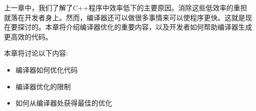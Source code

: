 上一章中，我们了解了C++程序中效率低下的主要原因。消除这些低效率的重担就落在开发者身上。然而，编译器还可以做很多事情来可以使程序更快。这就是现在要探讨的。本章将介绍编译器优化的重要内容，以及开发者如何帮助编译器生成更高效的代码。 

本章将讨论以下内容:

\begin{itemize}
\item
编译器如何优化代码

\item
编译器优化的限制

\item
如何从编译器处获得最佳的优化
\end{itemize}